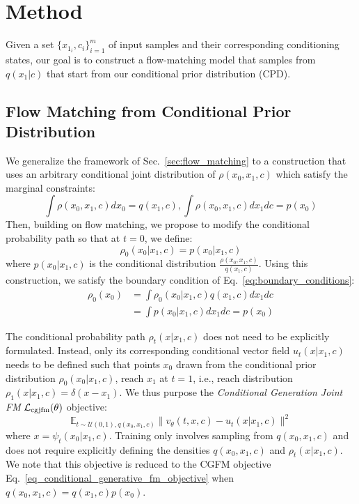  \section{Method}
\label{sec:method}











Given a set $\{x_{1_i},c_i\}_{i=1}^m$ of input samples and their corresponding conditioning states, our goal is to construct a flow-matching model that samples from $q(x_1|c)$ that start from our conditional prior distribution (CPD). 

\subsection{Flow Matching from Conditional Prior Distribution}
\label{sec:conditional_fm_joint}

We generalize the framework of  Sec.~\ref{sec:flow_matching} to a construction that uses an arbitrary conditional joint distribution of $\rho(x_0, x_1, c)$ which satisfy the marginal constraints:
\begin{equation*}
\label{eq:conditional_marginal}
    \int \rho(x_0, x_1, c)dx_0 = q(x_1, c),  \int \rho(x_0, x_1, c)dx_1dc = p(x_0)
\end{equation*}
Then, building on flow matching, we propose to modify the conditional probability path so that at $t=0$, we define:
\begin{equation}
    \rho_0(x_0|x_1, c) = p(x_0|x_1, c) 
\end{equation}
where $p(x_0|x_1, c)$ is the conditional distribution $\frac{\rho(x_0, x_1, c)}{q(x_1, c)}$. 
Using this construction, we satisfy the boundary condition of Eq.~\ref{eq:boundary_conditions}: 
\begin{align}
    \rho_0(x_0) &= \int\rho_0(x_0|x_1, c)q(x_1, c)dx_1dc  \\
                &=  \int p(x_0|x_1, c)dx_1dc = p(x_0)
\end{align}




The conditional probability path $\rho_t(x|x_1, c)$ does not need to be explicitly formulated. Instead, only its corresponding conditional vector field $u_t(x|x_1, c)$ needs to be defined such that points $x_0$ drawn from the conditional prior distribution $\rho_0(x_0|x_1, c) $, reach $x_1$ at $t=1$, i.e., reach distribution $\rho_1(x|x_1, c) = \delta(x - x_1)$.  We thus purpose the \emph{Conditional Generation Joint FM} ${\mathcal{L}}_{\rm cgjfm}(\theta)$ objective:
\begin{equation}\label{eq:conditionl_joint_cfm}
    \mathbb{E}_{t\sim \mathcal{U}(0,1), q(x_0,x_1,c)} \|v_\theta(t, x, c) - u_t(x | x_1, c)\|^2
\end{equation}
where $x = \psi_t(x_0|x_1,c)$.
Training only involves sampling from $q(x_0,x_1,c)$ and does not require explicitly defining the densities $q(x_0,x_1,c)$ and $\rho_t(x|x_1,c)$.
We note that this objective is reduced to the CGFM objective Eq.~\ref{eq_conditional_generative_fm_objective} when $q(x_0,x_1,c) = q(x_1, c)p(x_0)$.

